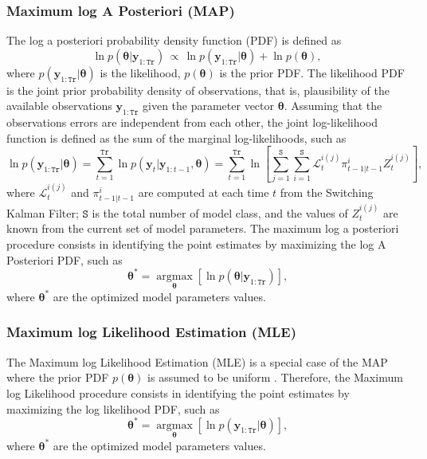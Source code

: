 \subsubsection{Maximum log A Posteriori (MAP)}

The log a posteriori probability density function (PDF) is defined as
\begin{equation}
\ln p(\bm\theta|\mathbf{y}_{1:\mathtt{Tr}}) \, \propto \, \ln p(\mathbf{y}_{1:\mathtt{Tr}}|\bm\theta) + \ln p(\bm\theta),
\label{EQ:BT}
\end{equation} 
where $p(\mathbf{y}_{1:\mathtt{Tr}}|\bm\theta)$ is the likelihood,  $p(\bm\theta)$ is the prior PDF.
The likelihood PDF is the joint prior probability density of observations, that is, plausibility of the available observations $\mathbf{y}_{1:\mathtt{Tr}}$ given the parameter vector $\bm\theta$.  
Assuming that the observations errors are independent from each other, the joint log-likelihood function is defined as the sum of the marginal log-likelihoods, such as 
\begin{equation}
\ln p(\mathbf{y}_{1:\mathtt{Tr}}|\bm\theta)  = \displaystyle\sum_{t=1}^{\mathtt{Tr}} \ln p(\mathbf{y}_{t}|\mathbf{y}_{1:t-1},\bm \theta) = \displaystyle\sum_{t=1}^{\mathtt{Tr}} \ln \left[ \sum_{j=1}^{\mathtt{S}} \sum_{i=1}^{\mathtt{S}} \mathcal{L}_{t}^{i(j)} \pi_{t-1|t-1}^{i} Z_{t}^{i(j)} \right] \text{,}
\label{EQ:LP}
\end{equation}
where $\mathcal{L}_{t}^{i(j)}$ and  $\pi_{t-1|t-1}^{i}$ are computed at each time $t$ from the Switching Kalman Filter; $\mathtt{S}$ is the total number of model class, and the values of $Z_{t}^{i(j)}$ are known from the current set of model parameters.
The maximum log a posteriori procedure consists in identifying the point estimates by maximizing the log A Posteriori PDF, such as
\begin{equation*}
\bm\theta^{*} = \underset{\bm\theta}{\text{arg}\max}\left[\ln p(\bm\theta|\mathbf{y}_{1:\mathtt{Tr}}) \right] \text{,}
\end{equation*}
where $\bm\theta^{*}$ are the optimized model parameters values.

\subsubsection{Maximum log Likelihood Estimation (MLE)}

The Maximum log Likelihood Estimation (MLE) is a special case of the MAP where the prior PDF $p(\bm\theta)$ is assumed to be uniform \cite{gelman2014bayesian}.
Therefore, the Maximum log Likelihood procedure consists in identifying the point estimates by maximizing the log likelihood PDF, such as
\begin{equation*}
\bm\theta^{*} = \underset{\bm\theta}{\text{arg}\max}\left[\ln  p(\mathbf{y}_{1:\mathtt{Tr}}|\bm\theta) \right] \text{,}
\end{equation*}
where $\bm\theta^{*}$ are the optimized model parameters values.


